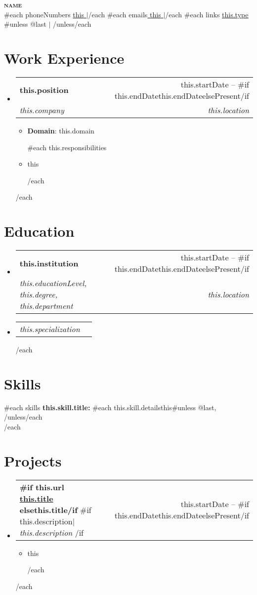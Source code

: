 \documentclass[letterpaper,11pt]{article}
\makeatletter
\newcommand{\resumeItem}[1]{
  \item\small{
    {#1 \vspace{-2pt}}
  }
}
\newcommand{\resumeSubheading}[4]{
  \vspace{-2pt}\item
    \begin{tabular*}{0.97\textwidth}[t]{l@{\extracolsep{\fill}}r}
      \textbf{#1} & #2 \\
      \textit{\small#3} & \textit{\small #4} \\
    \end{tabular*}\vspace{-7pt}
}
\newcommand{\resumeSubSubheading}[2]{
    \item
    \begin{tabular*}{0.97\textwidth}{l@{\extracolsep{\fill}}r}
      \textit{\small#1} & \textit{\small #2} \\
    \end{tabular*}\vspace{-7pt}
}
\newcommand{\resumeProjectHeading}[2]{
    \item
    \begin{tabular*}{0.97\textwidth}{l@{\extracolsep{\fill}}r}
      \small#1 & #2 \\
    \end{tabular*}\vspace{-7pt}
}
\newcommand{\resumeSubHeadingListStart}{\begin{itemize}[leftmargin=0.15in, label={}]}
\newcommand{\resumeSubHeadingListEnd}{\end{itemize}}
\newcommand{\resumeItemListStart}{\begin{itemize}}
\newcommand{\resumeItemListEnd}{\end{itemize}\vspace{-5pt}}
\makeatother
\begin{document}
\begin{center}
    \textbf{\Huge\scshape {{name}} } \\ \vspace{1pt}
    {{#each phoneNumbers}} \small{\underline{ {{this}} }} $|${{/each}}
    {{#each emails}}\small{\underline{ {{this}} }}$|${{/each}}
    {{#each links}} \small{\href{ {{this.url}} }{\underline{ {{this.type}} }}}{{#unless @last}} $|$ {{/unless}}{{/each}}
\end{center}

\section{Work Experience}
  \resumeSubHeadingListStart
  {{#each workExperiences}}
    \resumeSubheading
    { {{this.position}} }{ {{this.startDate}} -- {{#if this.endDate}}{{this.endDate}}{{else}}Present{{/if}} }
        { {{this.company}} }{ {{this.location}} }
        \resumeItemListStart
          \resumeItem{\textbf{Domain}: {{this.domain}} }
          {{#each this.responsibilities}}
          \resumeItem{ {{this}} }
          {{/each}}
        \resumeItemListEnd
  {{/each}}
  \resumeSubHeadingListEnd

\section{Education}
  \resumeSubHeadingListStart
  {{#each educations}}
    \resumeSubheading
    { {{this.institution}} } { {{this.startDate}} -- {{#if this.endDate}}{{this.endDate}}{{else}}Present{{/if}} }
        { {{this.educationLevel}}, {{this.degree}}, {{this.department}} }{ {{this.location}} }
        \resumeSubSubheading
          { {{this.specialization}} }
          {}
  {{/each}}
  \resumeSubHeadingListEnd

\section{Skills}
 \begin{itemize}[leftmargin=0.15in, label={}]
    \small{\item{
      {{#each skills}}
        \textbf{ {{this.skill.title}}: }{ {{#each this.skill.details}}{{this}}{{#unless @last}}, {{/unless}}{{/each}} } \\
      {{/each}}
    }}
 \end{itemize}

\section{Projects}
    \resumeSubHeadingListStart
    {{#each projects}}
      \resumeProjectHeading
        { \textbf{ {{#if this.url}} \href{ {{this.url}} }{ {{this.title}} } {{else}}{{this.title}}{{/if}} }{{#if this.description}}$|$\emph{ {{this.description}} } {{/if}} }{ {{this.startDate}} -- {{#if this.endDate}}{{this.endDate}}{{else}}Present{{/if}} }
          \resumeItemListStart
            {{#each this.responsibilities}}
              \resumeItem{ {{this}} }
            {{/each}}
          \resumeItemListEnd
    {{/each}}
    \resumeSubHeadingListEnd
\end{document}
